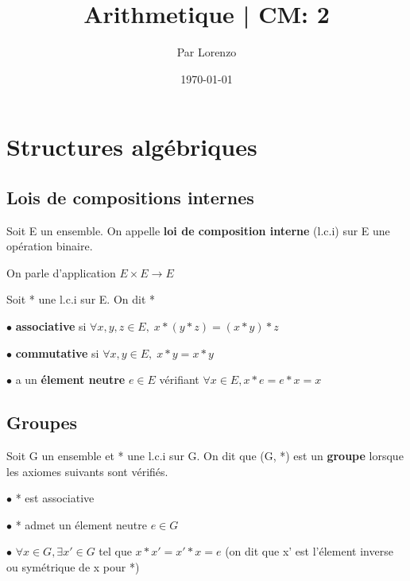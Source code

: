 \documentclass[a4paper, 12pt]{article}
\title{Arithmetique | CM: 2}
\author{Par Lorenzo}
\date{\today}
\begin{document}
\maketitle

\section{Structures algébriques}

\subsection{Lois de compositions internes}

\begin{definition}
    Soit E un ensemble. On appelle \textbf{loi de composition interne} (l.c.i) sur E une opération binaire.

    On parle d'application $E \times E \rightarrow E$
\end{definition}

\begin{definition}
    Soit * une l.c.i sur E. On dit *

    \item $\bullet$ \textbf{associative} si $\forall x, y, z \in E, \; x * (y * z) = (x * y) * z$
    \item $\bullet$ \textbf{commutative} si $\forall x, y \in E, \; x * y = x * y$
    \item $\bullet$ a un \textbf{élement neutre} $e \in E$ vérifiant $\forall x \in E, x * e = e * x = x$ 
\end{definition}

\subsection{Groupes}

\begin{definition}
    Soit G un ensemble et * une l.c.i sur G. On dit que (G, *) est un \textbf{groupe} lorsque les axiomes suivants sont vérifiés.

    \item $\bullet$ * est associative
    \item $\bullet$ * admet un élement neutre $e \in G$
    \item $\bullet$ $\forall x \in G, \exists x' \in G$ tel que $x * x' = x' * x = e$ (on dit que x' est l'élement inverse ou symétrique de x pour *)
\end{definition}
\end{document}
